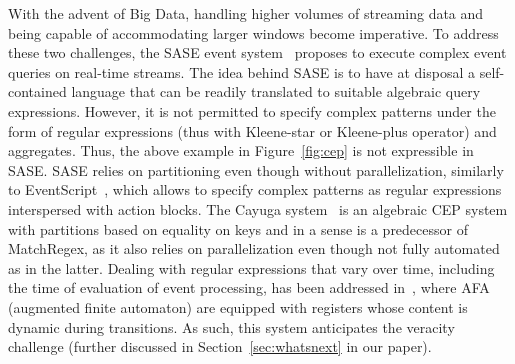 With the advent of Big Data, handling higher volumes of streaming data and being capable of accommodating larger windows become imperative. To address these two challenges, the SASE event system~\cite{WuDR06} proposes to execute complex event queries on real-time streams.
The idea behind SASE is to have at disposal
a self-contained language that can be readily translated to suitable algebraic query expressions.
However, it is not permitted to specify complex patterns under the form of regular expressions (thus with Kleene-star or Kleene-plus operator) and aggregates. Thus, the above example in Figure~\ref{fig:cep} is not expressible in SASE. 
SASE relies on partitioning even though without parallelization, similarly to EventScript~\cite{cohen_kalleberg_2008}, which allows to 
specify complex patterns as regular expressions interspersed with action
blocks. 
The Cayuga system~\cite{demers_et_al_2007} is an algebraic CEP system with partitions
based on equality on keys and in a sense is a predecessor of MatchRegex, as it also relies on parallelization
even though not fully automated as in the latter. 
Dealing with regular expressions that vary over time, including the time of evaluation of event processing, has been addressed in~\cite{chandramouli_goldstein_maier_2010}, where AFA (augmented finite automaton) are equipped with registers whose content is dynamic during transitions. As such, this system anticipates the veracity 
challenge (further discussed in Section~\ref{sec:whatsnext} in our paper). 
